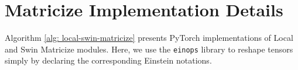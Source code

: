 \documentclass[a4,12pt]{article}
\begin{document}
	
	\section{Matricize Implementation Details} \label{app: matricize implementation details}
	
	Algorithm \ref{alg: local-swin-matricize} presents PyTorch implementations of Local and Swin Matricize modules. Here, we use the \texttt{einops} library to reshape tensors simply by declaring the corresponding Einstein notations.
	
	\begin{algorithm}[t!]
		\caption{PyTorch Pseudocode of Local and Swin Matricize modules. \label{alg: local-swin-matricize}}
		\vspace{5pt}
		\inputminted[fontsize=\footnotesize, linenos]{python}{local-sw-matricize.py}
	\end{algorithm}
	
	
	
	
	\clearpage
	\medskip
	
	
\end{document}
